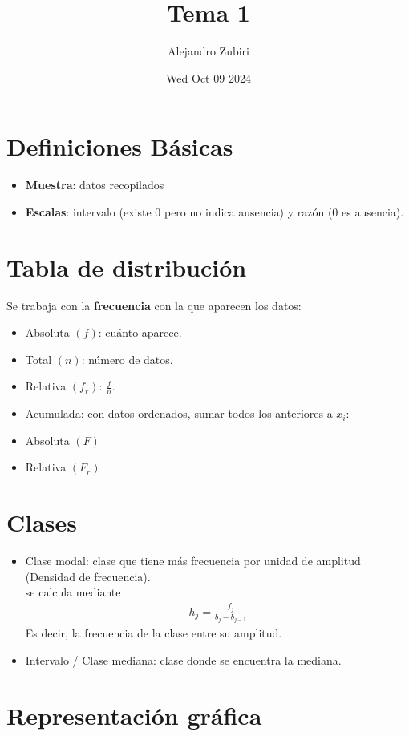 \documentclass{article}
\author{Alejandro Zubiri}
\date{Wed Oct 09 2024}
\title{Tema 1}
\begin{document}
\maketitle
\tableofcontents
\pagebreak
\section{Definiciones Básicas}
\begin{itemize}
    \item \textbf{Muestra}: datos recopilados
    \item \textbf{Escalas}: intervalo (existe 0 pero no indica ausencia) y razón (0 es ausencia).
\end{itemize}

\section{Tabla de distribución}
Se trabaja con la \textbf{frecuencia} con la que aparecen los datos:
\begin{itemize}
    \item Absoluta $(f)$: cuánto aparece.
    \item Total $(n)$: número de datos.
    \item Relativa $(f_r)$: $\frac{f}{n}$.
    \item Acumulada: con datos ordenados, sumar todos los anteriores a $x_i$:
    \item Absoluta $(F)$
    \item Relativa $(F_r)$
\end{itemize}
\section{Clases}
\begin{itemize}
    \item Clase modal: clase que tiene más frecuencia por unidad de amplitud (Densidad de frecuencia).\\
    se calcula mediante
    \begin{equation}
        \begin{split}
            h_j= \frac{f_j}{b_j - b_{j-1}}
        \end{split}
    \end{equation}
    Es decir, la frecuencia de la clase entre su amplitud.
    \item Intervalo / Clase mediana: clase donde se encuentra la mediana.
\end{itemize}
\section{Representación gráfica}
\end{document}
